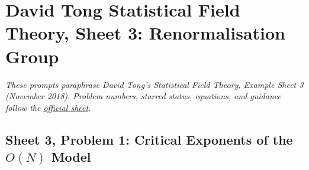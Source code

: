 \section{David Tong Statistical Field Theory, Sheet 3: Renormalisation Group}

\noindent\textit{These prompts paraphrase David Tong's \emph{Statistical Field Theory},
Example Sheet 3 (November 2018). Problem numbers, starred status, equations,
and guidance follow the
\href{https://davidtong.org/pdfs/teaching/statistical-field-theory/99c.pdf}{official sheet}.}

\subsection{Sheet 3, Problem 1: Critical Exponents of the $O(N)$ Model}

